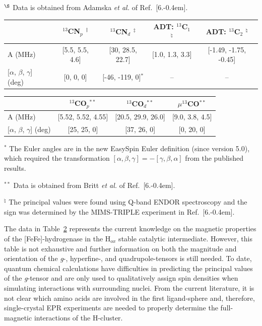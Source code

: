\begin{table}[htbp]
\begin{flushleft}
{$^{\S}$ Data is obtained from Adamska \textit{et al.} of Ref.~[6.\kern-0.4em]. }\end{flushleft}

\begin{tabular}{l|c|c|c|c}
 & $^{13}$CN$_p$ $^\ddagger$ & $^{13}$CN$_d$ $^\ddagger$ & ADT: $^{13}$C$_1$ $^\natural$ & ADT: $^{13}$C$_2$ $^\natural$ \\ \hline \hline
A (MHz) & {[}5.5, 5.5, 4.6{]} & {[}30, 28.5, 22.7{]} & {[}1.0, 1.3, 3.3{]} & {[}-1.49, -1.75, -0.45{]} \\
{[}$\alpha$, $\beta$, $\gamma${]} (deg) & {[}0, 0, 0{]} & {[}-46, -119, 0{]}$^\ast$ & -- & -- \\
\end{tabular}
\newline
\vspace*{0.5em}
\newline
\begin{tabular}{l|c|c|c}
 & $^{13}$CO$_p$$^{\ast\ast}$ & $^{13}$CO$_d$$^{\ast\ast}$ & $\mu^{13}$CO$^{\ast\ast}$ \\ \hline \hline
A (MHz) & {[}5.52, 5.52, 4.55{]} &  {[}20.5, 29.9, 26.0{]} & {[}9.0, 3.8, 4.5{]}\\
{[}$\alpha$, $\beta$, $\gamma${]} (deg) &  {[}25, 25, 0{]} & {[}37, 26, 0{]} & {[}0, 20, 0{]} \\
\end{tabular}\label{table:eprthing}

\begin{flushleft}\footnotesize{
$^\ast$ The Euler angles are in the new EasySpin Euler definition (since version 5.0), which required the transformation $[\alpha,\beta,\gamma]= -[\gamma,\beta,\alpha]$ from the published results.

$^{\ast\ast}$ Data is obtained from Britt \textit{et al.} of Ref.~[6.\kern-0.4em].

$^\natural$ The principal values were found using Q-band ENDOR spectroscopy and the sign was determined by the MIMS-TRIPLE experiment in Ref.~[6.\kern-0.4em].
} \end{flushleft}
\end{table}

The data in Table~\ref{table:eprthing} represents the current knowledge on the magnetic properties of the [FeFe]-hydrogenase in the H$_{ox}$ stable catalytic intermediate. However, this table is not exhaustive and further information on both the magnitude and orientation of the \textit{g}-, hyperfine-, and quadrupole-tensors is still needed. To date, quantum chemical calculations have difficulties in predicting the principal values of the \textit{g}-tensor and are only used to qualitatively assign spin densities when simulating interactions with surrounding nuclei.\cite{GrecoDFT,FiedlerDFT}  From the current literature, it is not clear which amino acids are involved in the first ligand-sphere and, therefore, single-crystal EPR experiments are needed to properly determine the full-magnetic interactions of the H-cluster. 

